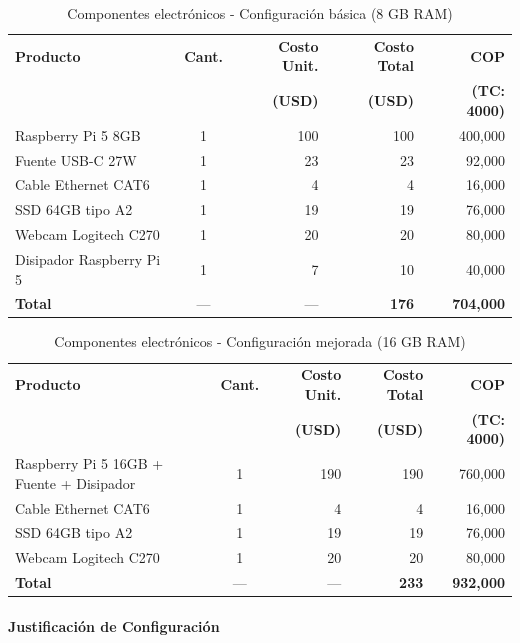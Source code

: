 \begin{table}[H]
\centering
\caption{Componentes electrónicos - Configuración básica (8 GB RAM)}
\label{tab:electronica_kit}
\small
\begin{tabular}{|l|c|r|r|r|}
\hline
\textbf{Producto} & \textbf{Cant.} & \textbf{Costo Unit.} & \textbf{Costo Total} & \textbf{COP} \\
 & & \textbf{(USD)} & \textbf{(USD)} & \textbf{(TC: 4000)} \\
\hline
Raspberry Pi 5 8GB & 1 & 100 & 100 & 400,000 \\
Fuente USB-C 27W & 1 & 23 & 23 & 92,000 \\
Cable Ethernet CAT6 & 1 & 4 & 4 & 16,000 \\
SSD 64GB tipo A2 & 1 & 19 & 19 & 76,000 \\
Webcam Logitech C270 & 1 & 20 & 20 & 80,000 \\
Disipador Raspberry Pi 5 & 1 & 7 & 10 & 40,000 \\
\hline
\textbf{Total} & --- & --- & \textbf{176} & \textbf{704,000} \\
\hline
\end{tabular}
\end{table}

\begin{table}[H]
\centering
\caption{Componentes electrónicos - Configuración mejorada (16 GB RAM)}
\label{tab:electronica_mejorada}
\small
\begin{tabular}{|l|c|r|r|r|}
\hline
\textbf{Producto} & \textbf{Cant.} & \textbf{Costo Unit.} & \textbf{Costo Total} & \textbf{COP} \\
 & & \textbf{(USD)} & \textbf{(USD)} & \textbf{(TC: 4000)} \\
\hline
Raspberry Pi 5 16GB + Fuente + Disipador & 1 & 190 & 190 & 760,000 \\
Cable Ethernet CAT6 & 1 & 4 & 4 & 16,000 \\
SSD 64GB tipo A2 & 1 & 19 & 19 & 76,000 \\
Webcam Logitech C270 & 1 & 20 & 20 & 80,000 \\
\hline
\textbf{Total} & --- & --- & \textbf{233} & \textbf{932,000} \\
\hline
\end{tabular}
\end{table}

\paragraph{Justificación de Configuración}

